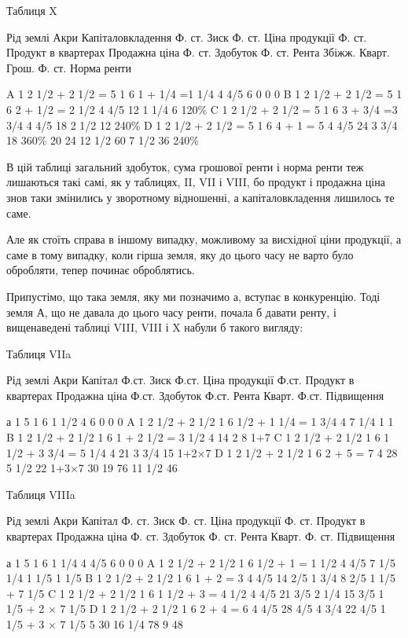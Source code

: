 Таблиця X

Рід землі
Акри
Капіталовкладення  Ф. ст.
Зиск Ф. ст.
Ціна продукції Ф. ст.
Продукт в квартерах
Продажна ціна Ф. ст.
Здобуток Ф. ст.
Рента
Збіжж. Кварт.
Грош. Ф. ст.
Норма ренти

A 1 2 1/2 + 2 1/2 = 5  1  6  1 + 1/4 =1 1/4     4 4/5   6     0         0     0
B 1 2 1/2 + 2 1/2 = 5  1  6  2 + 1/2 = 2 1/2    4 4/5   12  1 1/4   6     120\%
C 1 2 1/2 + 2 1/2 = 5  1  6  3 + 3/4 =3  3/4    4 4/5   18  2 1/2   12   240\%
D 1 2 1/2 + 2 1/2 = 5  1  6  4 + 1 = 5              4 4/5    24  3 3/4   18  360\%
                           20     24                  12 1/2                  60  7 1/2   36  240\%

В цій таблиці загальний здобуток, сума грошової ренти і норма ренти
теж лишаються такі самі, як у таблицях, II, VII і VIII, бо продукт і продажна
ціна знов таки змінились у зворотному відношенні, а капіталовкладення лишилось
те саме.

Але як стоїть справа в іншому випадку, можливому за висхідної ціни
продукції, а саме в тому випадку, коли гірша земля, яку до цього часу не
варто було обробляти, тепер починає оброблятись.

Припустімо, що така земля, яку ми позначимо а, вступає в конкуренцію.
Тоді земля А, що не давала до цього часу ренти, почала б давати ренту, і
вищенаведені таблиці VIII, VIII і X набули б такого вигляду:

Таблиця VIIa

Рід землі
Акри
Капітал Ф.ст.
Зиск Ф.ст.
Ціна продукції Ф.ст.
Продукт в квартерах
Продажна ціна Ф.ст.
Здобуток Ф.ст.
Рента
Кварт.
Ф.ст.
Підвищення

а 1               5          1 6                           1 1/2      4  6     0           0    0
A 1  2 1/2 + 2 1/2  1  6   1/2 + 1 1/4 = 1 3/4      4  7    1/4        1     1
B 1  2 1/2 + 2 1/2  1  6   1 + 2 1/2 = 3 1/2          4  14  2           8     1+7
C 1  2 1/2 + 2 1/2  1  6   1 1/2 + 3 3/4 = 5 1/4   4  21  3 3/4    15   1+2×7
D 1  2 1/2 + 2 1/2  1  6   2 + 5 = 7                       4  28  5 1/2    22   1+3×7
                                30              19                             76  11 1/2  46

Таблиця VIIIa

Рід землі
Акри
Капітал Ф. ст.
Зиск Ф. ст.
Ціна продукції Ф. ст.
Продукт в квартерах
Продажна ціна Ф. ст.
Здобуток Ф. ст.
Рента Кварт. Ф. ст.
Підвищення

а  1                      5   1  6                     1 1/4     4 4/5   6            0            0
           0
A  1  2 1/2 + 2 1/2  1  6   1/2  + 1  = 1 1/2     4 4/5   7 1/5     1/4         1 1/5     1 1/5
B  1  2 1/2 + 2 1/2  1  6    1 + 2  = 3                4 4/5   14 2/5   1 3/4     8 2/5      1 1/5 +
7 1/5
C  1  2 1/2 + 2 1/2  1  6    1 1/2 + 3 = 4 1/2   4 4/5   21 3/5    2 1/4    15 3/5    1 1/5 + 2 × 7
1/5
D  1  2 1/2 + 2 1/2  1  6    2 + 4 = 6                4 4/5    28 4/5    4 3/4    22 4/5   1 1/5 + 3
× 7 1/5
     5                              30              16 1/4                     78           9
   48
